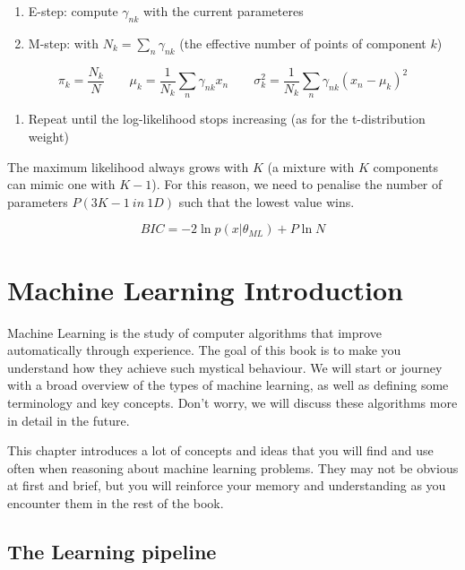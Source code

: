 \documentclass{article}
\begin{document}
\begin{enumerate}
\def\labelenumi{\arabic{enumi}.}
\item
  E-step: compute \(\gamma_{nk}\) with the current parameteres
\item
  M-step: with \(N_k = \sum_n \gamma_{nk}\) (the effective number of
  points of component \(k\))
\end{enumerate}

\[\pi_k = \frac{N_k}{N} \qquad \mu_k = \frac{1}{N_k} \sum_n \gamma_{nk} x_n
\qquad \sigma^2_k = \frac{1}{N_k} \sum_n \gamma_{nk} (x_n - \mu_k)^2\]

\begin{enumerate}
\def\labelenumi{\arabic{enumi}.}
\setcounter{enumi}{2}
\tightlist
\item
  Repeat until the log-likelihood stops increasing (as for the
  t-distribution weight)
\end{enumerate}

The maximum likelihood always grows with \(K\) (a mixture with \(K\)
components can mimic one with \(K-1\)). For this reason, we need to
penalise the number of parameters \(P(3K - 1\ in\ 1D)\) such that the
lowest value wins.

\[BIC = -2\ln p(x | \theta_{ML}) + P \ln N\]

\section{Machine Learning
Introduction}\label{machine-learning-introduction}

Machine Learning is the study of computer algorithms that improve
automatically through experience. The goal of this book is to make you
understand how they achieve such mystical behaviour. We will start or
journey with a broad overview of the types of machine learning, as well
as defining some terminology and key concepts. Don't worry, we will
discuss these algorithms more in detail in the future.

This chapter introduces a lot of concepts and ideas that you will find
and use often when reasoning about machine learning problems. They may
not be obvious at first and brief, but you will reinforce your memory
and understanding as you encounter them in the rest of the book.

\subsection{The Learning pipeline}\label{the-learning-pipeline}
\end{document}
